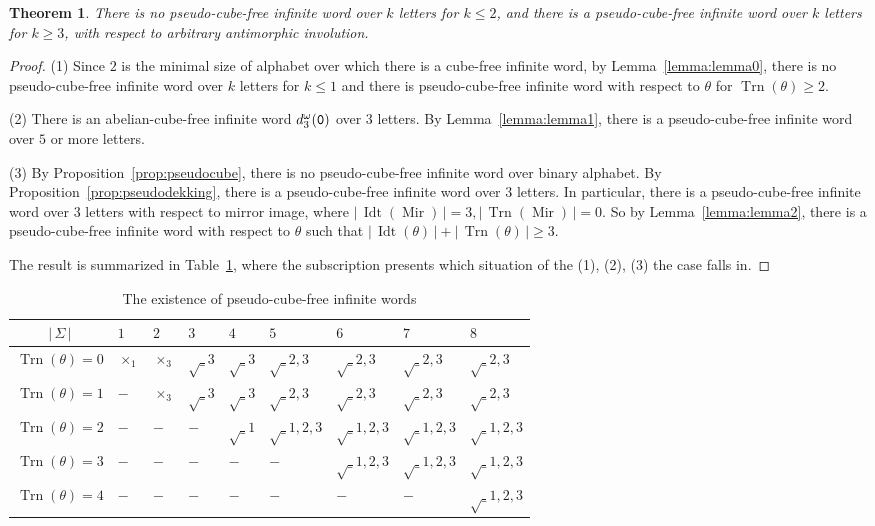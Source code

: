 \documentclass[12pt]{article}
\def\abs#1{{|\,#1\,|}}
\def\mirror{{\operatorname{Mir}}}
\def\id{{\operatorname{Idt}}}
\def\tr{{\operatorname{Trn}}}
\def\mtt#1{{\tt #1}}
\newtheorem{theorem}{Theorem}
\begin{document}
\begin{theorem}
There is no pseudo-cube-free infinite word over $k$ letters for
$k\leq 2$, and there is a pseudo-cube-free infinite word over $k$
letters for $k\geq 3$, with respect to arbitrary antimorphic
involution.
\end{theorem}
\begin{proof}
(1) Since $2$ is the minimal size of alphabet over which there is a
cube-free infinite word, by Lemma~\ref{lemma:lemma0}, there is no
pseudo-cube-free infinite word over $k$ letters for $k\leq 1$ and
there is pseudo-cube-free infinite word with respect to $\theta$ for
$\tr(\theta)\geq 2$.

(2) There is an abelian-cube-free infinite word $d_3^\omega(\mtt0)$
over $3$ letters. By Lemma~\ref{lemma:lemma1}, there is a
pseudo-cube-free infinite word over $5$ or more letters.

(3) By Proposition~\ref{prop:pseudocube}, there is no
pseudo-cube-free infinite word over binary alphabet. By
Proposition~\ref{prop:pseudodekking}, there is a pseudo-cube-free
infinite word over $3$ letters. In particular, there is a
pseudo-cube-free infinite word over $3$ letters with respect to
mirror image, where $\abs{\id(\mirror)}=3,\abs{\tr(\mirror)}=0$. So
by Lemma~\ref{lemma:lemma2}, there is a pseudo-cube-free infinite
word with respect to $\theta$ such that
$\abs{\id(\theta)}+\abs{\tr(\theta)}\geq 3$.

The result is summarized in Table~\ref{table:pseudocube}, where the
subscription presents which situation of the (1), (2), (3) the case
falls in.
\end{proof}

\begin{table}
\centering \caption{The existence of pseudo-cube-free infinite
words}
\begin{tabular}{c|p{5.5ex}p{5.5ex}p{5.5ex}p{5.5ex}p{5.5ex}p{5.5ex}p{5.5ex}p{5.5ex}}
  \hline
$\abs{\Sigma}$ & $1$ & $2$ & $3$ & $4$ & $5$ & $6$ & $7$ & $8$ \\
  \hline
  $\tr(\theta)=0$ & $\times_{1}$ & $\times_{3}$ & $\surd_{3}$ & $\surd_{3}$ & $\surd_{2,3}$ & $\surd_{2,3}$ & $\surd_{2,3}$ & $\surd_{2,3}$ \\
  $\tr(\theta)=1$ & $-$ & $\times_{3}$ & $\surd_{3}$ & $\surd_{3}$ & $\surd_{2,3}$ & $\surd_{2,3}$ & $\surd_{2,3}$ & $\surd_{2,3}$ \\
  $\tr(\theta)=2$ & $-$ & $-$ & $-$ & $\surd_{1}$ & $\surd_{1,2,3}$ & $\surd_{1,2,3}$ & $\surd_{1,2,3}$ & $\surd_{1,2,3}$ \\
  $\tr(\theta)=3$ & $-$ & $-$ & $-$ & $-$ & $-$ & $\surd_{1,2,3}$ & $\surd_{1,2,3}$ & $\surd_{1,2,3}$ \\
  $\tr(\theta)=4$ & $-$ & $-$ & $-$ & $-$ & $-$ & $-$ & $-$ & $\surd_{1,2,3}$ \\
  \hline
\end{tabular}\label{table:pseudocube}
\end{table}
\end{document}
